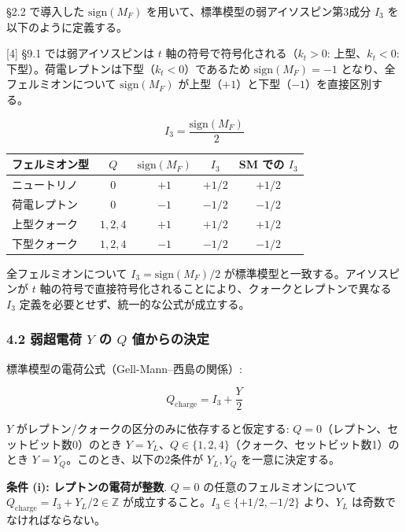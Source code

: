 \documentclass[
  a4paper,11pt]{ltjsarticle}
\newcounter{none} %
\begin{document}
§2.2 で導入した \(\text{sign}(M_F)\)
を用いて、標準模型の弱アイソスピン第3成分 \(I_3\)
を以下のように定義する。

{[}4{]} §9.1 では弱アイソスピンは \(t\)
軸の符号で符号化される（\(k_t > 0\): 上型、\(k_t < 0\):
下型）。荷電レプトンは下型（\(k_t < 0\)）であるため
\(\text{sign}(M_F) = -1\) となり、全フェルミオンについて
\(\text{sign}(M_F)\) が上型（\(+1\)）と下型（\(-1\)）を直接区別する。

\[I_3 = \frac{\text{sign}(M_F)}{2}\]

{\def\LTcaptype{none} %
\begin{longtable}[]{@{}lcccc@{}}
\toprule\noalign{}
フェルミオン型 & \(Q\) & \(\text{sign}(M_F)\) & \(I_3\) & SM での
\(I_3\) \\
\midrule\noalign{}
\endhead
\bottomrule\noalign{}
\endlastfoot
ニュートリノ & \(0\) & \(+1\) & \(+1/2\) & \(+1/2\) \\
荷電レプトン & \(0\) & \(-1\) & \(-1/2\) & \(-1/2\) \\
上型クォーク & \(1,2,4\) & \(+1\) & \(+1/2\) & \(+1/2\) \\
下型クォーク & \(1,2,4\) & \(-1\) & \(-1/2\) & \(-1/2\) \\
\end{longtable}
}

全フェルミオンについて \(I_3 = \text{sign}(M_F)/2\)
が標準模型と一致する。アイソスピンが \(t\)
軸の符号で直接符号化されることにより、クォークとレプトンで異なる \(I_3\)
定義を必要とせず、統一的な公式が成立する。

\subsubsection{\texorpdfstring{4.2 弱超電荷 \(Y\) の \(Q\)
値からの決定}{4.2 弱超電荷 Y の Q 値からの決定}}\label{ux5f31ux8d85ux96fbux8377-y-ux306e-q-ux5024ux304bux3089ux306eux6c7aux5b9a}

標準模型の電荷公式（Gell-Mann--西島の関係）:

\[Q_{\text{charge}} = I_3 + \frac{Y}{2}\]

\(Y\) がレプトン/クォークの区分のみに依存すると仮定する:
\(Q = 0\)（レプトン、セットビット数0）のとき
\(Y = Y_L\)、\(Q \in \{1,2,4\}\)（クォーク、セットビット数1）のとき
\(Y = Y_Q\)。このとき、以下の2条件が \(Y_L, Y_Q\) を一意に決定する。

\textbf{条件 (i): レプトンの電荷が整数}. \(Q = 0\)
の任意のフェルミオンについて
\(Q_{\text{charge}} = I_3 + Y_L/2 \in \mathbb{Z}\)
が成立すること。\(I_3 \in \{+1/2, -1/2\}\) より、\(Y_L\)
は奇数でなければならない。
\end{document}
